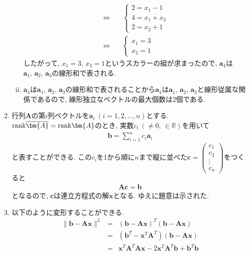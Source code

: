 \documentclass[dvipdfmx,titlepage, 11pt, a4paper]{jsarticle}%
\begin{document}
\begin{enumerate}[(1)]
\begin{enumerate}[(i)]
\begin{eqnarray*}
			            \Longleftrightarrow\ &&\left\{\begin{array}{l}
				            2=x_{1}-1     \\
				            4=x_{1}+x_{2} \\
				            2=x_{2}+1
			            \end{array}
			            \right.\\
			            \Longleftrightarrow\ && \left\{\begin{array}{l}
				            x_{1}=3 \\
				            x_{2}=1
			            \end{array}
			            \right.
		            \end{eqnarray*}
		            したがって, $x_{1}=3,\,x_{2}=1$というスカラーの組が求まったので, $\bm{a}_{4}$は$\bm{a}_{1},\,\bm{a}_{2},\,\bm{a}_{3}$の線形和で表される.
		      \item $\bm{a}_{4}$は$\bm{a}_{1},\,\bm{a}_{2},\,\bm{a}_{3}$の線形和で表されることから$\bm{a}_{4}$は$\bm{a}_{1},\,\bm{a}_{2},\,\bm{a}_{3}$と線形従属な関係であるので, 線形独立なベクトルの最大個数は2個である.
	      \end{enumerate}
	\item 行列$\bm{A}$の第$i$列ベクトルを$\bm{a}_{i}\ (i=1,2,...,n)$とする. ${\rm rank}\overline{\bm{A}}={\rm rank}\bm{A}$のとき, 実数$c_{i}\ (\neq 0,\,\in \mathbb{R})$を用いて
	      \begin{eqnarray*}
		      \bm{b}=\sum_{i=1}^{n}c_{i}\bm{a}_{i}
	      \end{eqnarray*}
	      と表すことができる. この$c_{i}$を1から順に$n$まで縦に並べた$\bm{c}=\begin{pmatrix}c_{1}\\c_{2}\\\vdots\\c_{n}\end{pmatrix}$をつくると
	      \begin{eqnarray*}
		      \bm{Ac}=\bm{b}
	      \end{eqnarray*}
	      となるので, $\bm{c}$は連立方程式の解$\bm{x}$となる. ゆえに題意は示された.
	\item 以下のように変形することができる.
	      \begin{eqnarray*}
		      \|\bm{b}-\bm{Ax}\|^{2}&=&(\bm{b}-\bm{Ax})^{T}(\bm{b}-\bm{Ax})\\
		      &=&(\bm{b}^{T}-\bm{x}^{T}\bm{A}^{T})(\bm{b}-\bm{Ax})\\
		      &=&\bm{x}^{T}\bm{A}^{T}\bm{A}\bm{x}-2\bm{x}^{T}\bm{A}^{T}\bm{b}+\bm{b}^{T}\bm{b}

\end{eqnarray*}
\end{enumerate}
\end{document}

